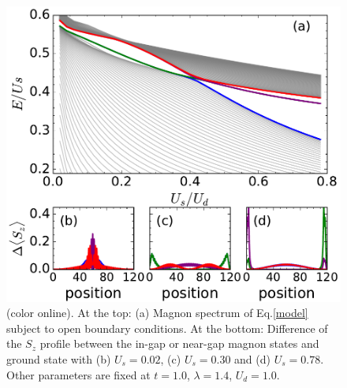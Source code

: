 \documentclass[amsmath,superscriptaddress,showpacs,aps,prb,twocolumn]{revtex4-1}
\begin{document}
\begin{figure}
\includegraphics[scale=0.48]{edge}
\caption{(color online). At the top: (a) Magnon spectrum of Eq.\ref{model} subject to open boundary conditions. At the bottom: Difference of the $S_z$ profile between the in-gap or near-gap magnon states and ground state with (b) $U_s=0.02$, (c) $U_s=0.30$ and (d) $U_s=0.78$. Other parameters are fixed at $t=1.0$, $\lambda=1.4$, $U_d=1.0$.}
\label{edge}
\end{figure}
\end{document}
